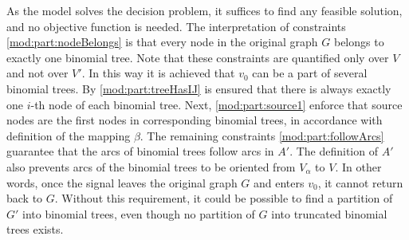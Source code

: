 As the model solves the decision problem, it suffices to find any feasible solution, and no objective function is needed.
The interpretation of constraints \eqref{mod:part:nodeBelongs} is that every node in the original graph $G$ belongs to exactly one binomial tree.
Note that these constraints are quantified only over $V$ and not over $V'$.
In this way it is achieved that $v_0$ can be a part of several binomial trees.
By \eqref{mod:part:treeHasIJ} is ensured that there is always exactly one $i$-th node of each binomial tree.
Next, \eqref{mod:part:source1} enforce that source nodes are the first nodes in corresponding binomial trees, in accordance with definition of the mapping $\beta$.
The remaining constraints \eqref{mod:part:followArcs} guarantee that the arcs of binomial trees follow arcs in $A'$.
The definition of $A'$ also prevents arcs of the binomial trees to be oriented from $V_\alpha$ to $V$.
In other words, once the signal leaves the original graph $G$ and enters $v_0$, it cannot return back to $G$.
Without this requirement, it could be possible to find a partition of $G'$ into binomial trees, even though no partition of $G$ into truncated binomial trees exists.


